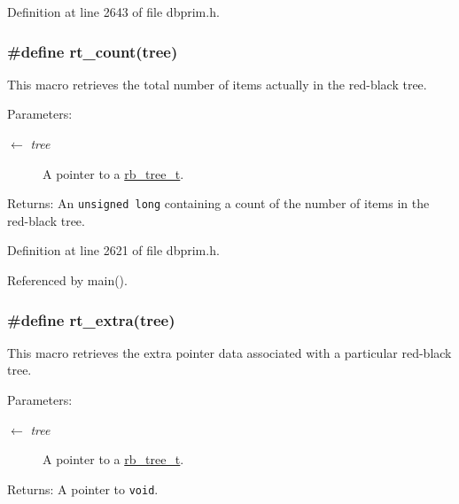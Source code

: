 Definition at line 2643 of file dbprim.h.\hypertarget{group__dbprim__rbtree_ga20}{
\subsubsection[rt\_\-count]{\setlength{\rightskip}{0pt plus 5cm}\#define rt\_\-count(tree)}}
\label{group__dbprim__rbtree_ga20}


This macro retrieves the total number of items actually in the red-black tree.

\begin{Desc}
\item[Parameters:]
\begin{description}
\item[\mbox{$\leftarrow$} {\em tree}]A pointer to a \hyperlink{group__dbprim__rbtree_ga0}{rb\_\-tree\_\-t}.\end{description}
\end{Desc}
\begin{Desc}
\item[Returns:]An {\tt unsigned long} containing a count of the number of items in the red-black tree.\end{Desc}


Definition at line 2621 of file dbprim.h.

Referenced by main().\hypertarget{group__dbprim__rbtree_ga23}{
\subsubsection[rt\_\-extra]{\setlength{\rightskip}{0pt plus 5cm}\#define rt\_\-extra(tree)}}
\label{group__dbprim__rbtree_ga23}


This macro retrieves the extra pointer data associated with a particular red-black tree.

\begin{Desc}
\item[Parameters:]
\begin{description}
\item[\mbox{$\leftarrow$} {\em tree}]A pointer to a \hyperlink{group__dbprim__rbtree_ga0}{rb\_\-tree\_\-t}.\end{description}
\end{Desc}
\begin{Desc}
\item[Returns:]A pointer to {\tt void}.\end{Desc}


